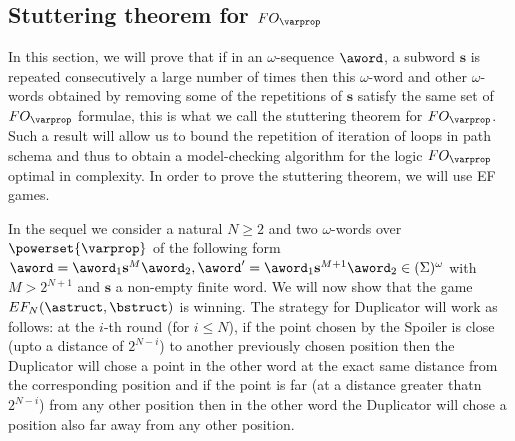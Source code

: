\subsection{Stuttering theorem for $FO_{\varprop}$}
In this section, we will prove that if in an $\omega$-sequence $\aword$, a subword $\mathbf{s}$ is repeated consecutively a large number of times then this $\omega$-word and other $\omega$-words obtained by removing some of the repetitions of $\mathbf{s}$ satisfy the same set of $FO_{\varprop}$ formulae, this is what we call the stuttering theorem for $FO_{\varprop}$. Such a result will allow us to bound the repetition of iteration of loops in path schema and thus to obtain a model-checking algorithm for the logic $FO_{\varprop}$ optimal in complexity. In order to prove the stuttering theorem, we will use EF games.

In the sequel we consider a natural $N \geq 2$ and two $\omega$-words over $\powerset{\varprop}$ of the following form $\aword = \aword_1 \mathbf{s}^M \aword_2, \aword'= \aword_1 \mathbf{s}^{M+1} \aword_2 \in (\Sigma)^{\omega}$ with $M > 2^{N+1}$ and $\mathbf{s}$ a non-empty finite word. We will now show that the game $EF_N(\astruct,\bstruct)$ is winning. The strategy for Duplicator will work as follows: at the $i$-th round (for $i \leq N$), if the point chosen by the Spoiler is close (upto a distance of $2^{N-i}$) to another previously chosen position then the Duplicator will chose a point in the other word at the exact same distance from the corresponding position and if the point is far (at a distance greater thatn $2^{N-i}$) from any other position  then in the other word the Duplicator will chose a position also far away from any other position. 

